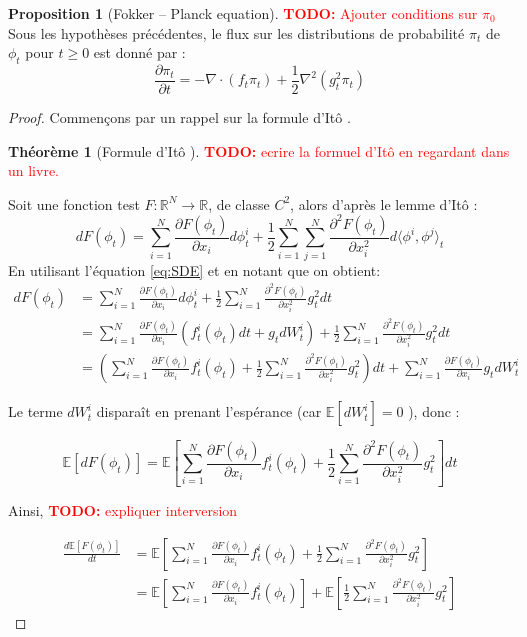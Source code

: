 \documentclass[a4paper,10pt]{article}
\theoremstyle{definition} %
\theoremstyle{definition} %
\newtheorem{proposition}[definition]{Proposition}
\theoremstyle{definition} %
\newtheorem{theorem}[definition]{Théorème}
\theoremstyle{definition} %
\newcommand{\E}[1]{\mathbb{E}\left[#1\right]}
\newcommand{\todo}[1]{\textcolor{red}{\textbf{TODO:} #1}}
\begin{document}
\begin{proposition}[Fokker – Planck equation] 
\todo{Ajouter conditions sur $\pi_0$}
Sous les hypothèses précédentes, le flux sur les distributions de probabilité $\pi_t$ de $\phi_t$ pour $t \geq 0$ est donné par :
    \begin{equation}
        \frac{\partial\pi_t}{\partial t} = -\nabla \cdot (f_t \pi_t) + \frac{1}{2}\nabla^2(g_t^2\pi_t)
    \end{equation}
\end{proposition}
\begin{proof}
Commençons par un rappel sur la formule d'Itô . 
\begin{theorem}[Formule d'Itô \cite{Oksendal2003}]
    \todo{ecrire la formuel d'Itô en regardant dans un livre. }
\end{theorem}

Soit une fonction test $F: \mathbb{R}^N \rightarrow \mathbb{R}$, de classe $C^2$, alors d'après le lemme d’Itô :
    \[dF(\phi_t) = \sum_{i=1}^N \frac{\partial F(\phi_t)}{\partial x_i} d\phi_t^i + \frac{1}{2} \sum_{i=1}^N \sum_{j=1}^N \frac{\partial^2 F(\phi_t)}{\partial x_i^2}d\langle \phi^i,\phi^j\rangle_t\]
En utilisant l'équation \eqref{eq:SDE} et en notant que 
 on obtient:
\begin{align*}
    dF(\phi_t) &= \sum_{i=1}^N \frac{\partial F(\phi_t)}{\partial x_i} d\phi_t^i + \frac{1}{2} \sum_{i=1}^N  \frac{\partial^2 F(\phi_t)}{\partial x_i^2} g_t^2 dt \\
    &= \sum_{i=1}^N \frac{\partial F(\phi_t)}{\partial x_i} (f^i_t(\phi_t)dt + g_tdW^i_t) + \frac{1}{2} \sum_{i=1}^N  \frac{\partial^2 F(\phi_t)}{\partial x_i^2} g_t^2 dt \\
    &= \left(\sum_{i=1}^N \frac{\partial F(\phi_t)}{\partial x_i} f^i_t(\phi_t) + \frac{1}{2} \sum_{i=1}^N  \frac{\partial^2 F(\phi_t)}{\partial x_i^2} g_t^2\right)dt + \sum_{i=1}^N \frac{\partial F(\phi_t)}{\partial x_i}  g_tdW^i_t
\end{align*}

Le terme $dW_t^i$ disparaît en prenant l'espérance  (car $\mathbb{E}[dW_t^i] = 0$ ), donc :

\[\E{dF(\phi_t)} = \E{\sum_{i=1}^N \frac{\partial F(\phi_t)}{\partial x_i} f^i_t(\phi_t) + \frac{1}{2} \sum_{i=1}^N \frac{\partial^2 F(\phi_t)}{\partial x_i^2} g_t^2} dt\]

Ainsi, \todo{expliquer interversion}

\begin{align}
    \frac{d\E{F(\phi_t)}}{dt} &= \E{\sum_{i=1}^N \frac{\partial F(\phi_t)}{\partial x_i} f^i_t(\phi_t) + \frac{1}{2} \sum_{i=1}^N  \frac{\partial^2 F(\phi_t)}{\partial x_i^2}g_t^2} \\
    &=\E{\sum_{i=1}^N \frac{\partial F(\phi_t)}{\partial x_i} f^i_t(\phi_t)} + \E{\frac{1}{2} \sum_{i=1}^N  \frac{\partial^2 F(\phi_t)}{\partial x_i^2} g_t^2}
\end{align}


\end{proof}
\end{document}
